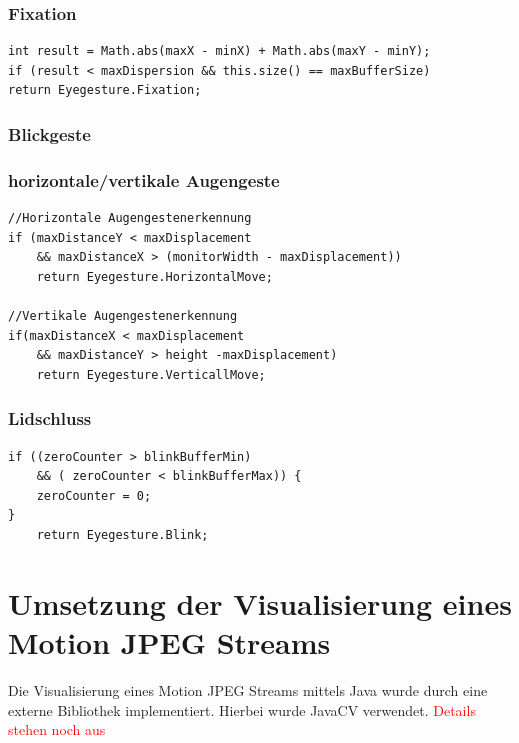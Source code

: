 \subsubsection{Fixation}
\begin{lstlisting}
int result = Math.abs(maxX - minX) + Math.abs(maxY - minY);  
if (result < maxDispersion && this.size() == maxBufferSize)
return Eyegesture.Fixation;
\end{lstlisting}

\subsubsection{Blickgeste}

\subsubsection{horizontale/vertikale Augengeste}
\begin{lstlisting}
//Horizontale Augengestenerkennung  
if (maxDistanceY < maxDisplacement 
	&& maxDistanceX > (monitorWidth - maxDisplacement)) 
	return Eyegesture.HorizontalMove;
    
//Vertikale Augengestenerkennung 
if(maxDistanceX < maxDisplacement 
	&& maxDistanceY > height -maxDisplacement) 
	return Eyegesture.VerticallMove;
\end{lstlisting}

\subsubsection{Lidschluss}
\begin{lstlisting}
if ((zeroCounter > blinkBufferMin) 
	&& ( zeroCounter < blinkBufferMax)) { 
	zeroCounter = 0; 
} 
	return Eyegesture.Blink;
\end{lstlisting}
%


\section{Umsetzung der Visualisierung eines Motion JPEG Streams}
Die Visualisierung eines Motion JPEG Streams mittels Java wurde durch eine externe Bibliothek implementiert. Hierbei wurde JavaCV verwendet. \textcolor{red}{Details stehen noch aus}

